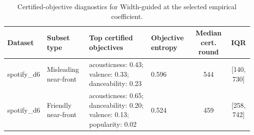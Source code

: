 \begin{table}[t]
\centering
\caption{Certified-objective diagnostics for Width-guided at the selected empirical coefficient.}
\label{tab:app-cert-objectives}
\scriptsize
\setlength{\tabcolsep}{3pt}
\begin{tabular}{llllcc}
\toprule
Dataset & Subset type & Top certified objectives & Objective entropy & Median cert. round & IQR \\
\midrule
spotify\_d6 & Misleading near-front & acousticness: 0.43; valence: 0.33; danceability: 0.23 & 0.596 & 544 & [140, 730] \\
spotify\_d6 & Friendly near-front & acousticness: 0.65; danceability: 0.20; valence: 0.13; popularity: 0.02 & 0.524 & 459 & [258, 742] \\
\bottomrule
\end{tabular}
\end{table}
